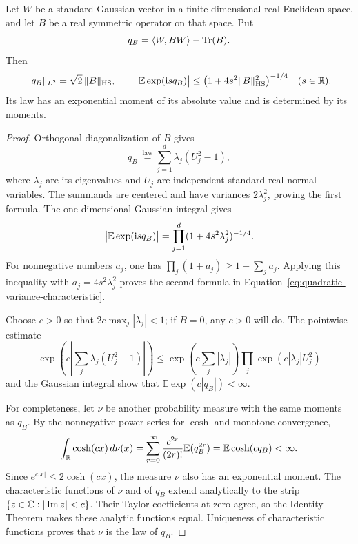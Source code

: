 \begin{lemma}\label{lem:gaussian-quadratic}
Let \(W\) be a standard Gaussian vector in a finite-dimensional
real Euclidean space, and let \(B\) be a real symmetric operator
on that space. Put
\[
 q_B=\langle W,BW\rangle-\operatorname{Tr}(B).
\]
Then
\begin{equation}\label{eq:quadratic-variance-characteristic}
 \|q_B\|_{L^2}=\sqrt{2}\,\|B\|_{\mathrm{HS}},
 \qquad
 \bigl|\mathbb E\exp(\mathrm{i} s q_B)\bigr|
 \leq\bigl(1+4s^2\|B\|_{\mathrm{HS}}^2\bigr)^{-1/4}
 \quad(s\in\mathbb R).
\end{equation}
Its law has an exponential moment of its absolute value and is
determined by its moments.
\end{lemma}

\begin{proof}
Orthogonal diagonalization of \(B\) gives
\[
 q_B\ \overset{\mathrm{law}}{=}
 \sum_{j=1}^d\lambda_j(U_j^2-1),
\]
where \(\lambda_j\) are its eigenvalues and \(U_j\) are independent
standard real normal variables. The summands are centered and
have variances \(2\lambda_j^2\), proving the first formula.
The one-dimensional Gaussian integral gives
\[
 \bigl|\mathbb E\exp(\mathrm{i} s q_B)\bigr|
 =\prod_{j=1}^d(1+4s^2\lambda_j^2)^{-1/4}.
\]
For nonnegative numbers \(a_j\), one has
\(\prod_j(1+a_j)\geq1+\sum_j a_j\). Applying this inequality with
\(a_j=4s^2\lambda_j^2\) proves the second formula in
Equation~\eqref{eq:quadratic-variance-characteristic}.

Choose \(c>0\) so that \(2c\max_j|\lambda_j|<1\); if \(B=0\),
any \(c>0\) will do. The pointwise estimate
\[
 \exp\!\left(c\left|\sum_j\lambda_j(U_j^2-1)\right|\right)
 \leq
 \exp\!\left(c\sum_j|\lambda_j|\right)
 \prod_j\exp(c|\lambda_j|U_j^2)
\]
and the Gaussian integral show that
\(\mathbb E\exp(c|q_B|)<\infty\).

For completeness, let \(\nu\) be another probability measure with
the same moments as \(q_B\). By the nonnegative power series for
\(\cosh\) and monotone convergence,
\[
 \int_{\mathbb R}\cosh(cx)\,d\nu(x)
 =\sum_{r=0}^{\infty}
   \frac{c^{2r}}{(2r)!}\mathbb E(q_B^{2r})
 =\mathbb E\cosh(cq_B)<\infty.
\]
Since \(e^{c|x|}\leq2\cosh(cx)\), the measure \(\nu\) also has an
exponential moment. The characteristic functions of \(\nu\) and
of \(q_B\) extend analytically to the strip
\(\{z\in\mathbb C:|\operatorname{Im}z|<c\}\). Their Taylor coefficients
at zero agree, so the Identity Theorem makes these analytic
functions equal. Uniqueness of characteristic functions proves
that \(\nu\) is the law of \(q_B\).
\end{proof}

